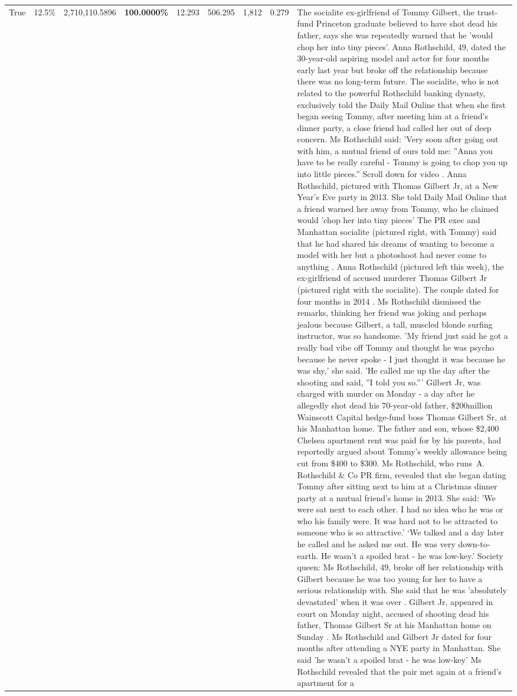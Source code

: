 \begin{table}[H]
\begin{tabular}{lllrlllll}
True & 12.5\% & 2,710,110.5896 & \bfseries \color{red} 100.0000\% & 12.293 & 506.295 & 1,812 & 0.279 & The socialite ex-girlfriend of Tommy Gilbert, the trust-fund Princeton graduate believed to have shot dead his father, says she was repeatedly warned that he 'would chop her into tiny pieces'. Anna Rothschild, 49, dated the 30-year-old aspiring model and actor for four months early last year but broke off the relationship because there was no long-term future. The socialite, who is not related to the powerful Rothschild banking dynasty, exclusively told the Daily Mail Online that when she first began seeing Tommy, after meeting him at a friend's dinner party, a close friend had called her out of deep concern. Ms Rothschild said: 'Very soon after going out with him, a mutual friend of ours told me: ''Anna you have to be really careful - Tommy is going to chop you up into little pieces.'' Scroll down for video . Anna Rothschild, pictured with Thomas Gilbert Jr, at a New Year's Eve party in 2013. She told Daily Mail Online that a friend warned her away from Tommy, who he claimed would 'chop her into tiny pieces' The PR exec and Manhattan socialite (pictured right, with Tommy) said that he had shared his dreams of wanting to become a model with her but a photoshoot had never come to anything . Anna Rothschild (pictured left this week), the ex-girlfriend of accused murderer Thomas Gilbert Jr (pictured right with the socialite). The couple dated for four months in 2014 . Ms Rothschild dismissed the remarks, thinking her friend was joking and perhaps jealous because Gilbert, a tall, muscled blonde surfing instructor, was so handsome. 'My friend just said he got a really bad vibe off Tommy and thought he was psycho because he never spoke - I just thought it was because he was shy,' she said. 'He called me up the day after the shooting and said, ''I told you so.''' Gilbert Jr, was charged with murder on Monday - a day after he allegedly shot dead his 70-year-old father, \$200million Wainscott Capital hedge-fund boss Thomas Gilbert Sr, at his Manhattan home. The father and son, whose \$2,400 Chelsea apartment rent was paid for by his parents, had reportedly argued about Tommy's weekly allowance being cut from \$400 to \$300. Ms Rothschild, who runs A. Rothschild \& Co PR firm, revealed that she began dating Tommy after sitting next to him at a Christmas dinner party at a mutual friend's home in 2013. She said: 'We were sat next to each other. I had no idea who he was or who his family were. It was hard not to be attracted to someone who is so attractive.' ‘We talked and a day later he called and he asked me out. He was very down-to-earth. He wasn’t a spoiled brat - he was low-key.’ Society queen: Ms Rothschild, 49, broke off her relationship with Gilbert because he was too young for her to have a serious relationship with. She said that he was 'absolutely devastated' when it was over . Gilbert Jr, appeared in court on Monday night, accused of shooting dead his father, Thomas Gilbert Sr at his Manhattan home on Sunday . Ms Rothschild and Gilbert Jr dated for four months after attending a NYE party in Manhattan. She said 'he wasn't a spoiled brat - he was low-key' Ms Rothschild revealed that the pair met again at a friend’s apartment for a 
\end{tabular}
\end{table}
